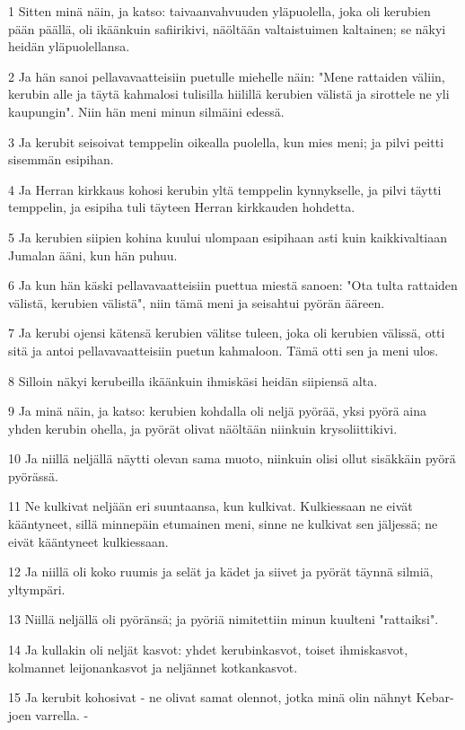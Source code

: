 \par 1 Sitten minä näin, ja katso: taivaanvahvuuden yläpuolella, joka oli kerubien pään päällä, oli ikäänkuin safiirikivi, näöltään valtaistuimen kaltainen; se näkyi heidän yläpuolellansa.
\par 2 Ja hän sanoi pellavavaatteisiin puetulle miehelle näin: "Mene rattaiden väliin, kerubin alle ja täytä kahmalosi tulisilla hiilillä kerubien välistä ja sirottele ne yli kaupungin". Niin hän meni minun silmäini edessä.
\par 3 Ja kerubit seisoivat temppelin oikealla puolella, kun mies meni; ja pilvi peitti sisemmän esipihan.
\par 4 Ja Herran kirkkaus kohosi kerubin yltä temppelin kynnykselle, ja pilvi täytti temppelin, ja esipiha tuli täyteen Herran kirkkauden hohdetta.
\par 5 Ja kerubien siipien kohina kuului ulompaan esipihaan asti kuin kaikkivaltiaan Jumalan ääni, kun hän puhuu.
\par 6 Ja kun hän käski pellavavaatteisiin puettua miestä sanoen: "Ota tulta rattaiden välistä, kerubien välistä", niin tämä meni ja seisahtui pyörän ääreen.
\par 7 Ja kerubi ojensi kätensä kerubien välitse tuleen, joka oli kerubien välissä, otti sitä ja antoi pellavavaatteisiin puetun kahmaloon. Tämä otti sen ja meni ulos.
\par 8 Silloin näkyi kerubeilla ikäänkuin ihmiskäsi heidän siipiensä alta.
\par 9 Ja minä näin, ja katso: kerubien kohdalla oli neljä pyörää, yksi pyörä aina yhden kerubin ohella, ja pyörät olivat näöltään niinkuin krysoliittikivi.
\par 10 Ja niillä neljällä näytti olevan sama muoto, niinkuin olisi ollut sisäkkäin pyörä pyörässä.
\par 11 Ne kulkivat neljään eri suuntaansa, kun kulkivat. Kulkiessaan ne eivät kääntyneet, sillä minnepäin etumainen meni, sinne ne kulkivat sen jäljessä; ne eivät kääntyneet kulkiessaan.
\par 12 Ja niillä oli koko ruumis ja selät ja kädet ja siivet ja pyörät täynnä silmiä, yltympäri.
\par 13 Niillä neljällä oli pyöränsä; ja pyöriä nimitettiin minun kuulteni "rattaiksi".
\par 14 Ja kullakin oli neljät kasvot: yhdet kerubinkasvot, toiset ihmiskasvot, kolmannet leijonankasvot ja neljännet kotkankasvot.
\par 15 Ja kerubit kohosivat - ne olivat samat olennot, jotka minä olin nähnyt Kebar-joen varrella. -
